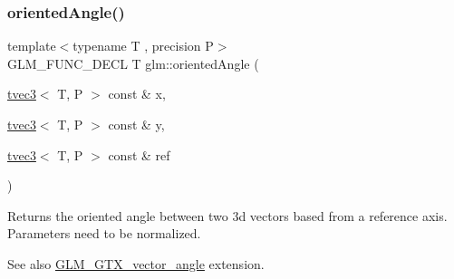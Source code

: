 \subsubsection{\texorpdfstring{oriented\+Angle()}{orientedAngle()}\hspace{0.1cm}{\footnotesize\ttfamily [2/2]}}
{\footnotesize\ttfamily template$<$typename T , precision P$>$ \\
G\+L\+M\+\_\+\+F\+U\+N\+C\+\_\+\+D\+E\+CL T glm\+::oriented\+Angle (\begin{DoxyParamCaption}\item[{\hyperlink{structglm_1_1tvec3}{tvec3}$<$ T, P $>$ const \&}]{x,  }\item[{\hyperlink{structglm_1_1tvec3}{tvec3}$<$ T, P $>$ const \&}]{y,  }\item[{\hyperlink{structglm_1_1tvec3}{tvec3}$<$ T, P $>$ const \&}]{ref }\end{DoxyParamCaption})}

Returns the oriented angle between two 3d vectors based from a reference axis. Parameters need to be normalized. \begin{DoxySeeAlso}{See also}
\hyperlink{group__gtx__vector__angle}{G\+L\+M\+\_\+\+G\+T\+X\+\_\+vector\+\_\+angle} extension. 
\end{DoxySeeAlso}
